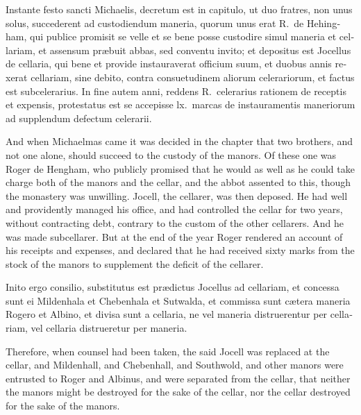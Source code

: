 \documentclass[10pt]{book}
\begin{document}
\begin{paracol}{2}
\switchcolumn*

\begin{otherlanguage}{latin}
Instante festo sancti Michaelis, decretum est in capitulo, ut duo fratres, non unus solus, succederent ad custodiendum maneria, quorum unus erat R.\ de Hehingham, qui publice promisit se velle et se bene posse custodire simul maneria et cellariam, et assensum pr\ae{}buit abbas, sed conventu invito; et depositus est Jocellus de cellaria, qui bene et provide instauraverat officium suum, et duobus annis rexerat cellariam, sine debito, contra consuetudinem aliorum celerariorum, et factus est subcelerarius. In fine autem anni, reddens R.\ celerarius rationem de receptis et expensis, protestatus est se accepisse lx.\ marcas de instauramentis maneriorum ad supplendum defectum celerarii.
\end{otherlanguage}

\switchcolumn

And when Michaelmas came it was decided in the chapter that two brothers, and not one alone, should succeed to the custody of the manors. Of these one was Roger de Hengham, who publicly promised that he would as well as he could take charge both of the manors and the cellar, and the abbot assented to this, though the monastery was unwilling. Jocell, the cellarer, was then deposed. He had well and providently managed his office, and had controlled the cellar for two years, without contracting debt, contrary to the custom of the other cellarers. And he was made subcellarer. But at the end of the year Roger rendered an account of his receipts and expenses, and declared that he had received sixty marks from the stock of the manors to supplement the deficit of the cellarer.

\switchcolumn*

\begin{otherlanguage}{latin}
Inito ergo consilio, substitutus est pr\ae{}dictus Jocellus ad cellariam, et concessa sunt ei Mildenhala et Chebenhala et Sutwalda, et commissa sunt c\ae{}tera maneria Rogero et Albino, et divisa sunt a cellaria, ne vel maneria distruerentur per cellariam, vel cellaria distrueretur per maneria.
\end{otherlanguage}

\switchcolumn

Therefore, when counsel had been taken, the said Jocell was replaced at the cellar, and Mildenhall, and Chebenhall, and Southwold, and other manors were entrusted to Roger and Albinus, and were separated from the cellar, that neither the manors might be destroyed for the sake of the cellar, nor the cellar destroyed for the sake of the manors.


\end{paracol}
\end{document}
